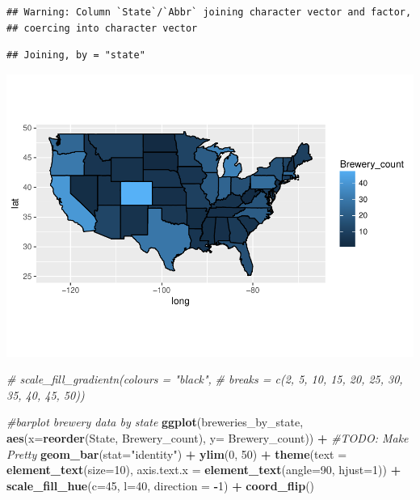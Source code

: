 \documentclass[]{article}
\newenvironment{Shaded}{\begin{snugshade}}{\end{snugshade}}
\newcommand{\KeywordTok}[1]{\textcolor[rgb]{0.13,0.29,0.53}{\textbf{#1}}}
\newcommand{\DataTypeTok}[1]{\textcolor[rgb]{0.13,0.29,0.53}{#1}}
\newcommand{\DecValTok}[1]{\textcolor[rgb]{0.00,0.00,0.81}{#1}}
\newcommand{\StringTok}[1]{\textcolor[rgb]{0.31,0.60,0.02}{#1}}
\newcommand{\CommentTok}[1]{\textcolor[rgb]{0.56,0.35,0.01}{\textit{#1}}}
\newcommand{\OperatorTok}[1]{\textcolor[rgb]{0.81,0.36,0.00}{\textbf{#1}}}
\newcommand{\NormalTok}[1]{#1}
\begin{document}
\begin{verbatim}
## Warning: Column `State`/`Abbr` joining character vector and factor,
## coercing into character vector
\end{verbatim}

\begin{verbatim}
## Joining, by = "state"
\end{verbatim}

\includegraphics{Analysis_Final_files/figure-latex/unnamed-chunk-7-1.pdf}

\begin{Shaded}
\begin{Highlighting}[]
  \CommentTok{# scale_fill_gradientn(colours = "black",}
  \CommentTok{#                         breaks = c(2, 5, 10, 15, 20, 25, 30, 35, 40, 45, 50))}
\end{Highlighting}
\end{Shaded}

\begin{Shaded}
\begin{Highlighting}[]
\CommentTok{#barplot brewery data by state}
\KeywordTok{ggplot}\NormalTok{(breweries_by_state, }\KeywordTok{aes}\NormalTok{(}\DataTypeTok{x=}\KeywordTok{reorder}\NormalTok{(State, Brewery_count), }\DataTypeTok{y=}\NormalTok{ Brewery_count)) }\OperatorTok{+}\StringTok{  }\CommentTok{#TODO: Make Pretty}
\StringTok{  }\KeywordTok{geom_bar}\NormalTok{(}\DataTypeTok{stat=}\StringTok{"identity"}\NormalTok{) }\OperatorTok{+}
\StringTok{  }\KeywordTok{ylim}\NormalTok{(}\DecValTok{0}\NormalTok{, }\DecValTok{50}\NormalTok{) }\OperatorTok{+}
\StringTok{  }\KeywordTok{theme}\NormalTok{(}\DataTypeTok{text =} \KeywordTok{element_text}\NormalTok{(}\DataTypeTok{size=}\DecValTok{10}\NormalTok{),}
        \DataTypeTok{axis.text.x =} \KeywordTok{element_text}\NormalTok{(}\DataTypeTok{angle=}\DecValTok{90}\NormalTok{, }\DataTypeTok{hjust=}\DecValTok{1}\NormalTok{)) }\OperatorTok{+}
\StringTok{  }\KeywordTok{scale_fill_hue}\NormalTok{(}\DataTypeTok{c=}\DecValTok{45}\NormalTok{, }\DataTypeTok{l=}\DecValTok{40}\NormalTok{, }\DataTypeTok{direction =} \OperatorTok{-}\DecValTok{1}\NormalTok{) }\OperatorTok{+}
\StringTok{  }\KeywordTok{coord_flip}\NormalTok{()}
\end{Highlighting}
\end{Shaded}
\end{document}
